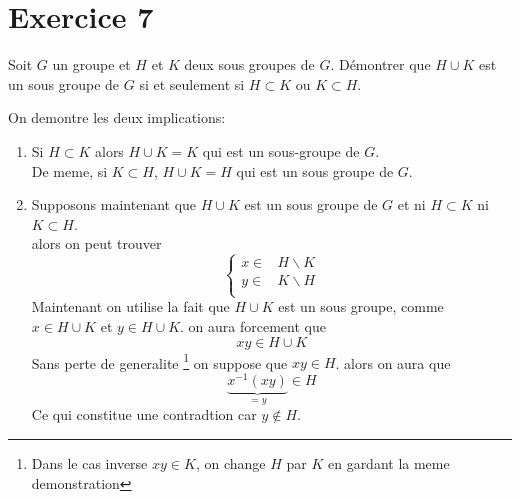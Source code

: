 \documentclass{report}
\begin{document}
\section{Exercice 7} %
{
Soit $G$ un groupe et $H$ et $K$ deux sous groupes de $G$. Démontrer que $H\cup
K$ est un sous groupe de $G$ si et seulement si $H\subset K$ ou $K\subset H$.
}
\begin{myproof}
On demontre les deux implications:

\begin{enumerate}
  \item Si $H \subset K$ alors $H\cup K = K$ qui est un sous-groupe de $G$.\\
    De meme, si $K \subset H$, $H\cup K = H$ qui est un sous groupe de $G$.
  \item Supposons maintenant que $H\cup K$ est un sous groupe de $G$ et ni $H \subset K$ ni $K \subset H$.\\
    alors on peut trouver 
    $$
    \begin{cases}
      x \in &H\backslash K\\
      y \in &K\backslash H\\
    \end{cases}
    $$
    Maintenant on utilise la fait que $H\cup K$ est un sous groupe, comme $x \in H \cup K$ et $y \in H \cup K$. on aura forcement que 
    $$
    xy \in H \cup K
    $$
    Sans perte de generalite \footnote{Dans le cas inverse $xy \in K$, on change $H$ par $K$ en gardant la meme demonstration}
    on suppose que $xy \in H$. alors on aura que
    $$
    \underbrace{x^{-1}(xy)}_{ = y} \in H
    $$
    Ce qui constitue une contradtion car $y \not \in H$.

\end{enumerate}
\end{myproof}




\end{document}
